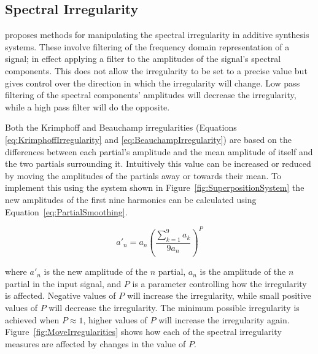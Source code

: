 	\subsection{Spectral Irregularity}
	\label{sec:FeatureControl-Parameterisation-Irregularity}
		\citet{beauchamp2007analysis} proposes methods for manipulating the spectral irregularity in additive
		synthesis systems. These involve filtering of the frequency domain representation of a signal; in effect
		applying a filter to the amplitudes of the signal's spectral components. This does not allow the
		irregularity to be set to a precise value but gives control over the direction in which the irregularity
		will change. Low pass filtering of the spectral components' amplitudes will decrease the irregularity,
		while a high pass filter will do the opposite.
		
		Both the Krimphoff and Beauchamp irregularities (Equations \ref{eq:KrimphoffIrregularity} and
		\ref{eq:BeauchampIrregularity}) are based on the differences between each partial's amplitude and the mean
		amplitude of itself and the two partials surrounding it. Intuitively this value can be increased or reduced
		by moving the amplitudes of the partials away or towards their mean. To implement this using the system
		shown in Figure~\ref{fig:SuperpositionSystem} the new amplitudes of the first nine harmonics can be
		calculated using Equation~\ref{eq:PartialSmoothing}.

		\begin{equation}
			a'_{n} = a_{n} \left( \frac{\sum_{k = 1}^{9} a_{k}}{9a_{n}} \right) ^{P}
			\label{eq:PartialSmoothing}
		\end{equation}

		where $a'_{n}$ is the new amplitude of the $n$ partial, $a_{n}$ is the amplitude of the
		$n$ partial in the input signal, and $P$ is a parameter controlling how the irregularity is
		affected. Negative values of $P$ will increase the irregularity, while small positive values of $P$ will
		decrease the irregularity. The minimum possible irregularity is achieved when $P \approx 1$, higher values
		of $P$ will increase the irregularity again. Figure~\ref{fig:MoveIrregularities} shows how each of the
		spectral irregularity measures are affected by changes in the value of $P$.

